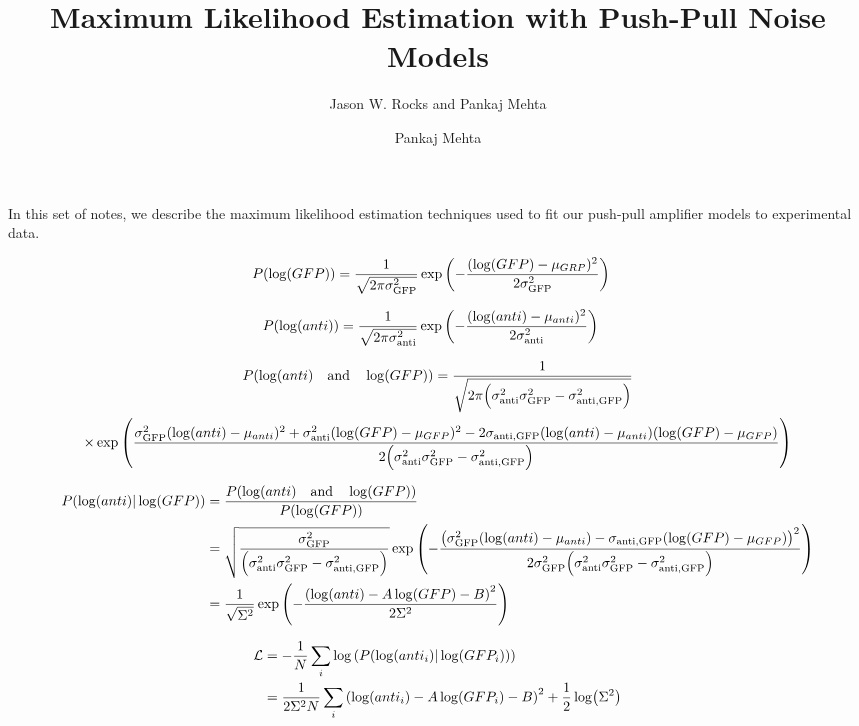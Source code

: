 \documentclass[aps,onecolumn,superscriptaddress,notitlepage]{revtex4-1}
\begin{document}
\title{Maximum Likelihood Estimation with Push-Pull Noise Models}
\author{Jason W. Rocks and Pankaj Mehta}
\author{Pankaj Mehta}
\maketitle

In this set of notes, we describe the maximum likelihood estimation techniques used to fit our push-pull amplifier models to experimental data.
 
\begin{align}
P(\log(GFP)) &= \frac{1}{\sqrt{2\pi\sigma_{\mathrm{GFP}}^2 }}\exp\qty(-\frac{(\log(GFP)-\mu_{GRP})^2}{2\sigma_{\mathrm{GFP}}^2})
\end{align}

\begin{align}
P(\log(anti)) &= \frac{1}{\sqrt{2\pi\sigma_{\mathrm{anti}}^2 }}\exp\qty(-\frac{(\log(anti)-\mu_{anti})^2}{2\sigma_{\mathrm{anti}}^2})
\end{align}


\begin{gather}
P(\log(anti) \qand \log(GFP)) = \frac{1}{\sqrt{2\pi \qty(\sigma_{\mathrm{anti}}^2\sigma_{\mathrm{GFP}}^2 - \sigma_{\mathrm{anti}, \mathrm{GFP}}^2)}}\\
\times\exp\qty(\frac{\sigma_{\mathrm{GFP}}^2(\log(anti)-\mu_{anti})^2 + \sigma_{\mathrm{anti}}^2 (\log(GFP)-\mu_{GFP})^2 - 2\sigma_{\mathrm{anti}, \mathrm{GFP}}(\log(anti)-\mu_{anti})(\log(GFP)-\mu_{GFP})}{2\qty(\sigma_{\mathrm{anti}}^2\sigma_{\mathrm{GFP}}^2 - \sigma_{\mathrm{anti}, \mathrm{GFP}}^2)})
\end{gather}

\begin{align}
P(\log(anti)| \log(GFP)) &= \frac{P(\log(anti) \qand \log(GFP)) }{P(\log(GFP))}\\
&= \sqrt{\frac{\sigma_{\mathrm{GFP}}^2}{\qty(\sigma_{\mathrm{anti}}^2\sigma_{\mathrm{GFP}}^2 - \sigma_{\mathrm{anti}, \mathrm{GFP}}^2)}}  \exp\qty(-\frac{\qty(\sigma_{\mathrm{GFP}}^2(\log(anti)-\mu_{anti}) - \sigma_{\mathrm{anti}, \mathrm{GFP}} (\log(GFP)-\mu_{GFP}))^2}{2\sigma_{\mathrm{GFP}}^2\qty(\sigma_{\mathrm{anti}}^2\sigma_{\mathrm{GFP}}^2 - \sigma_{\mathrm{anti}, \mathrm{GFP}}^2)})\\
&= \frac{1}{\sqrt{\Sigma^2}}\exp\qty(-\frac{\qty(\log(anti)-A\log(GFP)-B)^2}{2\Sigma^2})
\end{align}

\begin{align}
\mathcal{L} &= -\frac{1}{N}\sum_i\log\qty(P(\log(anti_i)| \log(GFP_i)))\\
 &=  \frac{1}{2\Sigma^2N}\sum_i\qty(\log(anti_i)-A\log(GFP_i)-B)^2 +\frac{1}{2}\log(\Sigma^2)
\end{align}
\end{document}
